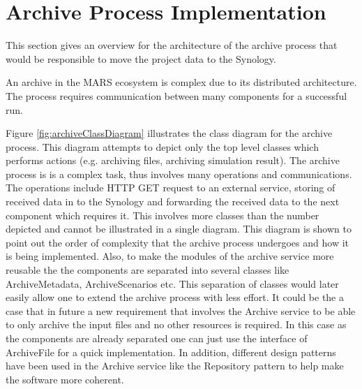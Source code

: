 \section{Archive Process Implementation}
This section gives an overview for the architecture of the archive process that would be responsible
to move the project data to the Synology. 

An archive in the MARS ecosystem is complex due to its distributed architecture. The process requires communication between many components for a 
successful run. %

Figure \ref{fig:archiveClassDiagram} illustrates the class diagram for the archive process. This diagram attempts to depict only the top level classes
which performs actions (e.g. archiving files, archiving simulation result). The archive process is is a complex 
task, thus involves many operations and communications. The operations include HTTP GET request to an external service, storing of received
data in to the Synology and forwarding the received data to the next component which requires it. This involves more classes than the number depicted
and cannot be illustrated in a single diagram. This diagram is shown to point out the order of complexity that the archive process undergoes and how it is being
implemented. Also, to make the modules of the archive service more reusable the the components are separated into several classes
like ArchiveMetadata, ArchiveScenarios etc. This separation
of classes would later easily allow one to extend the archive process with less effort. It could be the a case that in future a new requirement
that involves the Archive service to be able to only archive
the input files and no other resources is required. In this case as the components are already separated one can just use the interface of ArchiveFile for a quick implementation. 
In addition, different design patterns have been used
in the Archive service like the Repository pattern \cite{repo} to help make the software more coherent.
 

